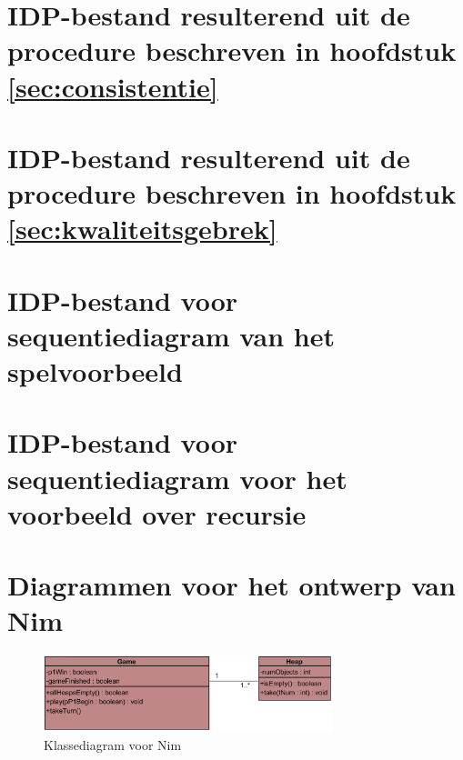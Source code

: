 \chapter{IDP-bestand resulterend uit de procedure beschreven in hoofdstuk \ref{sec:consistentie}}\label{app:consistentie}

\label{code:consistentie}

\chapter{IDP-bestand resulterend uit de procedure beschreven in hoofdstuk \ref{sec:kwaliteitsgebrek}}\label{app:kwaliteitsgebrek}

\label{code:kwaliteitsgebrek}

\chapter{IDP-bestand voor sequentiediagram van het spelvoorbeeld}\label{app:seq-diagram-game}

\label{code:seq-diagram-game}

\chapter{IDP-bestand voor sequentiediagram voor het voorbeeld over recursie}\label{app:seq-recursion}

\label{code:seq-recursion}

\chapter{Diagrammen voor het ontwerp van Nim}\label{app:design-nim}

\begin{figure}[htp]
	\centering
	\includegraphics[width=0.75\textwidth]{chap-evaluatie/ClassDiagram1.png}
	\caption{Klassediagram voor Nim}
	\label{fig:nim-cd}
\end{figure}

